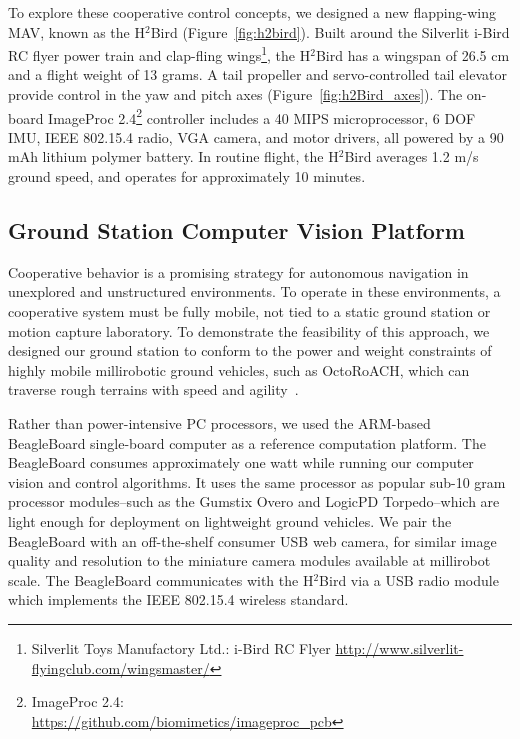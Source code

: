 \documentclass{aamas2013}
\begin{document}
To explore these cooperative control concepts, we designed a new 
flapping-wing MAV, known as the H$^2$Bird (Figure~\ref{fig:h2bird}). Built 
around the Silverlit i-Bird RC flyer power train and clap-fling wings\footnote{\raggedright Silverlit Toys Manufactory Ltd.: i-Bird RC Flyer
\href{http://www.silverlit-flyingclub.com/wingsmaster/}
     {http://www.silverlit-flyingclub.com/wingsmaster/}}, 
the H$^2$Bird has a wingspan of 26.5 cm and a flight weight of 13 grams. A 
tail propeller and servo-controlled tail elevator provide control in the yaw 
and pitch axes (Figure~\ref{fig:h2Bird_axes}). The on-board ImageProc 2.4\footnote{ImageProc 2.4: \\
\href{https://github.com/biomimetics/imageproc\_pcb}
     {https://github.com/biomimetics/imageproc\_pcb}} 
controller includes a 40 MIPS microprocessor, 6 DOF IMU, 
IEEE 802.15.4 radio, VGA camera, and motor drivers, all powered by a 90 mAh 
lithium polymer battery. In routine flight, the H$^2$Bird averages 1.2 m/s 
ground speed, and operates for approximately 10 minutes.

\subsection{Ground Station Computer Vision Platform}
Cooperative behavior is a promising strategy for autonomous navigation in 
unexplored and unstructured environments. To operate in these 
environments, a cooperative system must be fully mobile, not tied to a 
static ground station or motion capture laboratory. To demonstrate the 
feasibility of this approach, we designed our ground station to conform to 
the power and weight constraints of highly mobile millirobotic ground 
vehicles, such as OctoRoACH, which can traverse rough terrains with speed and 
agility~\cite{Pullin2012Dynamic}. 

Rather than power-intensive PC processors, we used the ARM-based BeagleBoard 
single-board computer as a reference computation platform. The BeagleBoard 
consumes approximately one watt while running our computer vision and 
control algorithms. It uses the same processor as popular sub-10 gram 
processor modules--such as the Gumstix Overo and LogicPD Torpedo--which are 
light enough for deployment on lightweight ground vehicles. We pair the 
BeagleBoard with an off-the-shelf consumer USB web camera, for similar image 
quality and resolution to the miniature camera modules available at 
millirobot scale. The BeagleBoard communicates with the H$^2$Bird via a 
USB radio module which implements the IEEE 802.15.4 wireless standard.
\end{document}
